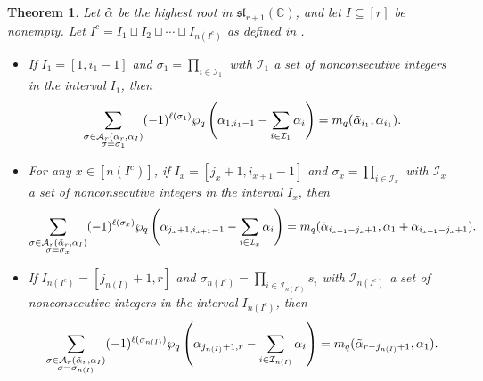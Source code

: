 \documentclass[10pt]{article}
\newtheorem{theorem}{Theorem}[section]
\newcommand{\speclin}[0]{\mathfrak{sl}_{r+1}(\mathbb{C})}
\newcommand{\hr}[0]{\Tilde{\alpha}}
\newcommand{\qpartition}[1]{\wp_q\left(#1\right)}
\begin{document}
\begin{theorem}\label{THE BEST THEOREM EVER}
    Let $\hr$ be the highest root in $\speclin$, and let $I\subseteq [r]$ be nonempty. Let $I^c = I_1 \sqcup I_2 \sqcup \cdots \sqcup I_{n(I^c)}$ as defined in . 
    \begin{itemize}
        \item If $I_1=[1,i_1-1]$ and $\sigma_1=\prod_{i\in\mathcal{I}_1}$ with $\mathcal{I}_1$ a set of nonconsecutive integers in the interval $I_1$, then
        \begin{equation}
            \sum_{\substack{\sigma\in\mathcal{A}_r(\hr_r,\alpha_I)\\\sigma=\sigma_1}}(-1)^{\ell(\sigma_1)}\qpartition{\alpha_{1,i_1-1}-\sum_{i\in\mathcal{I}_1}\alpha_i}=m_q(\hr_{i_1},\alpha_{i_1}).\label{pays the rent left edge case}
        \end{equation}
        \item For any $x\in[n(I^c)]$, if $I_x=[j_x+1,i_{x+1}-1]$ and $\sigma_x=\prod_{i\in\mathcal{I}_x}$ with $\mathcal{I}_x$ a set of nonconsecutive integers in the interval $I_x$, then
        \begin{equation}
        \sum_{\substack{\sigma\in\mathcal{A}_r(\hr_r,\alpha_I)\\\sigma=\sigma_x}}(-1)^{\ell(\sigma_x)}\qpartition{\alpha_{j_x+1,i_{x+1}-1}-\sum_{i\in\mathcal{I}_x}\alpha_i}=m_q(\hr_{i_{x+1}-j_x+1},\alpha_1+\alpha_{i_{x+1}-j_x+1}).\label{pays the rent middle cases}
        \end{equation}
        \item If $I_{n(I^c)}=[j_{n(I)}+1,r]$ and $\sigma_{n(I^c)}=\prod_{i\in\mathcal{I}_{n(I^c)}}s_i$ with $\mathcal{I}_{n(I^c)}$ a set of nonconsecutive integers in the interval $I_{n(I^c)}$, then 
        \begin{equation}
            \sum_{\substack{\sigma\in\mathcal{A}_r(\hr_r,\alpha_I)\\\sigma=\sigma_{n(I)}}}(-1)^{\ell(\sigma_{n(I)})}\qpartition{\alpha_{j_{n(I)}+1,r}-\sum_{i\in\mathcal{I}_{n(I)}}\alpha_i}=m_q(\hr_{r-j_{n(I)}+1},\alpha_1).\label{pays the rent right edge case}
        \end{equation}
    \end{itemize}
\end{theorem}
\end{document}
